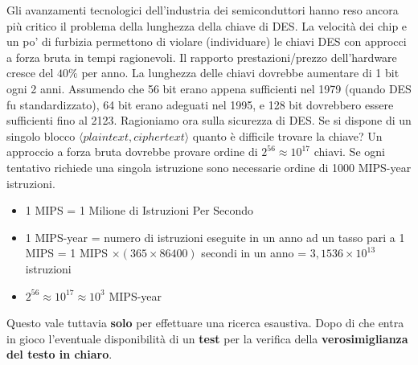 Gli avanzamenti tecnologici dell'industria dei semiconduttori hanno reso ancora più critico il problema della lunghezza della chiave di DES. La velocità dei chip e un po' di furbizia permettono di violare (individuare) le chiavi DES con approcci a forza bruta in tempi ragionevoli. Il rapporto prestazioni/prezzo dell'hardware cresce del
$40\%$ per anno. La lunghezza delle chiavi dovrebbe aumentare di 1 bit ogni 2 anni. Assumendo che 56 bit erano appena sufficienti nel 1979 (quando DES fu standardizzato), 64 bit erano adeguati nel 1995, e 128 bit dovrebbero essere sufficienti fino al 2123. \newline \newline Ragioniamo ora sulla sicurezza di DES. Se si dispone di un singolo blocco $\langle plaintext,ciphertext \rangle$ quanto è difficile trovare la chiave? Un approccio a forza bruta dovrebbe provare ordine di $2^{56} \approx 10^{17}$ chiavi. Se ogni tentativo richiede una singola istruzione sono necessarie ordine di 1000 MIPS-year istruzioni.
\begin{itemize}
  \item 1 MIPS = 1 Milione di Istruzioni Per Secondo
  \item 1 MIPS-year = numero di istruzioni eseguite in un anno ad un tasso pari a 1 MIPS = 1 MIPS $\times(365 \times 86400)$ secondi in un anno = $3,1536 \times 10^{13}$ istruzioni
  \item $2^{56} \approx 10^{17} \approx 10^{3}$ MIPS-year
\end{itemize}
Questo vale tuttavia \textbf{solo} per effettuare una ricerca esaustiva. Dopo di che entra in gioco l'eventuale disponibilità di un \textbf{test} per la verifica della \textbf{verosimiglianza del testo in chiaro}.

